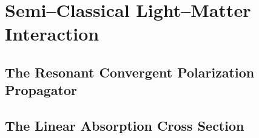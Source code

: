 \section{Semi--Classical Light--Matter Interaction}
\label{sec:SCLMI}

\subsection{The Resonant Convergent Polarization Propagator}
\label{sec:PolarProp}

\subsection{The Linear Absorption Cross Section}
\label{sec:AbsorptionTheory}
